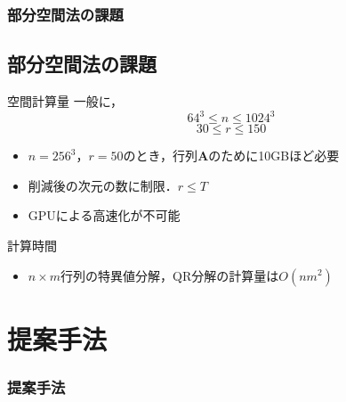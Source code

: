 \documentclass[aspectratio=169,dvipdfmx,hyperref={bookmarks=true}]{beamer}
\begin{document}
\begin{frame}
\frametitle{部分空間法の課題}
\subsection{部分空間法の課題}
	\begin{block}{空間計算量}
		一般に，
		\[64^3 \le n \le 1024^3\]
		\[30 \le r \le 150\]
		
   		\begin{itemize}
			\item $n = 256^3$，$r=50$のとき，行列$\bm{A}$のために10GBほど必要
   			\item 削減後の次元の数に制限．$r \le T$
   			\item GPUによる高速化が不可能
		\end{itemize}
	\end{block}

	\begin{block}{計算時間}
 		\begin{itemize}
		\item $n \times m$行列の特異値分解，QR分解の計算量は$O(nm^2)$
	\end{itemize}
	\end{block}
\end{frame}
\section{提案手法}
\begin{frame}
\frametitle{提案手法}

 \end{frame}
\end{document}
